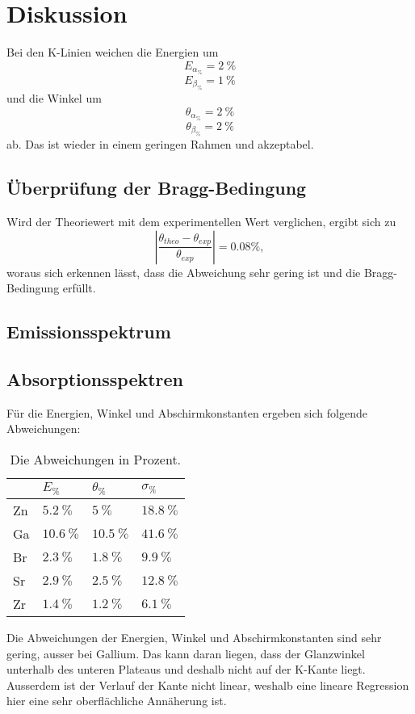 \section{Diskussion}
Bei den K-Linien weichen die Energien um
\begin{equation*}
  E_{\alpha_{\%}}=2\ \%
\end{equation*}
\begin{equation*}
  E_{\beta_{\%}}=1\ \%
\end{equation*}
und die Winkel um
\begin{equation*}
  \theta_{\alpha_{\%}}=2\ \%
\end{equation*}
\begin{equation*}
  \theta_{\beta_{\%}}=2\ \%
\end{equation*}
ab. Das ist wieder in einem geringen Rahmen und akzeptabel.

\subsection{Überprüfung der Bragg-Bedingung}
Wird der Theoriewert mit dem experimentellen Wert verglichen, ergibt sich zu
\begin{equation*}
  |\frac{\theta_{theo}-\theta_{exp}}{\theta_{exp}}|=0.08\%,
\end{equation*}
woraus sich erkennen lässt, dass die Abweichung sehr gering ist und die Bragg-Bedingung erfüllt.

\subsection{Emissionsspektrum}

\subsection{Absorptionsspektren}
Für die Energien, Winkel und Abschirmkonstanten ergeben sich folgende Abweichungen:
\begin{table}[H]
  \centering
  \begin{tabular}{l|l|l|l}
  & $E_{\%}$ & $\theta_{\%}$ & $\sigma_{\%}$\\ \hline
  Zn & $5.2\ \%$ & $5\ \%$ & $18.8\ \%$\\ \hline
  Ga & $10.6\ \%$ & $10.5\ \%$ & $41.6\ \%$\\ \hline
  Br & $2.3\ \%$ & $1.8\ \%$ & $9.9\ \%$\\ \hline
  Sr & $2.9\ \%$ & $2.5\ \%$ & $12.8\ \%$\\ \hline
  Zr & $1.4\ \%$ & $1.2\ \%$ & $6.1\ \%$\\ \hline
  \end{tabular}
  \caption{Die Abweichungen in Prozent.}
\end{table}
Die Abweichungen der Energien, Winkel und Abschirmkonstanten sind sehr gering, ausser bei Gallium. Das kann daran liegen, dass der Glanzwinkel unterhalb des unteren Plateaus und deshalb nicht auf der K-Kante liegt. Ausserdem ist der Verlauf der Kante nicht linear, weshalb eine lineare Regression hier eine sehr oberflächliche Annäherung ist. 

